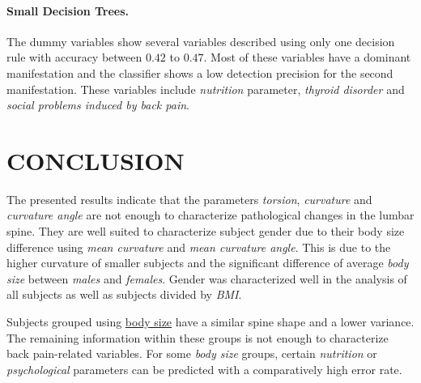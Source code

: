 \documentclass[a4paper,twoside]{style/article}
\newcommand{\com}[1]{\textcolor{orange}{\uline{#1}}}
\begin{document}
\paragraph{Small Decision Trees. }
The dummy variables show several variables described using only one decision rule with accuracy between $0.42$ to $0.47$.
Most of these variables have a dominant manifestation and the classifier shows a low detection precision for the second manifestation.
These variables include \emph{nutrition} parameter, \emph{thyroid disorder} and \emph{social problems induced by back pain}.




\section{\uppercase{Conclusion}}
\label{sec:Conclusion}
\noindent The presented results indicate that the parameters \emph{torsion}, \emph{curvature} and \emph{curvature angle} are not enough to characterize pathological changes in the lumbar spine.
They are well suited to characterize subject gender due to their body size difference using \emph{mean curvature} and \emph{mean curvature angle}.
This is due to the higher curvature of smaller subjects and the significant difference of average \emph{body size} between \emph{males} and \emph{females}.
Gender was characterized well in the analysis of all subjects as well as subjects divided by \emph{BMI}.

Subjects grouped using \underline{body size} have a similar spine shape and a lower variance.
The remaining information within these groups is not enough to characterize back pain-related variables.
For some \emph{body size} groups, certain \emph{nutrition} or \emph{psychological} parameters can be predicted with a comparatively high error rate.
\end{document}
